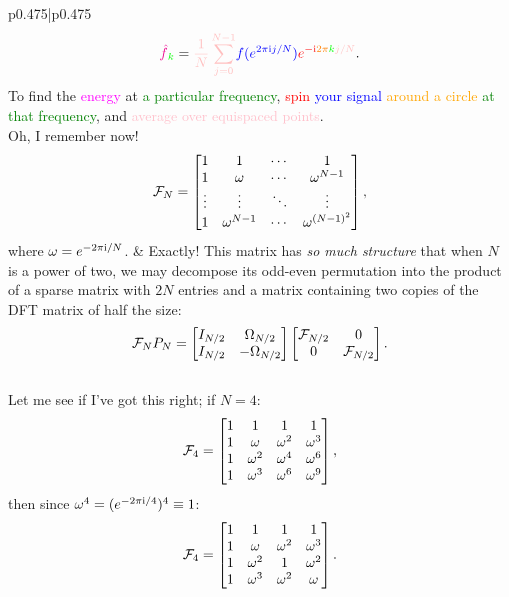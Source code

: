 \documentclass[11pt,letterpaper]{article}
\begin{document}
\begin{longtable}{p{}|p{}}
\[
\textcolor{magenta}{\hat{f}}_{\textcolor{green}{k}} = \textcolor{pink}{\dfrac{1}{N}\sum_{j=0}^{N-1}} \textcolor{blue}{f(e^{2\pi\i j/N})}\textcolor{red}{e}^{\textcolor{red}{-\i}\textcolor{orange}{2\pi} \textcolor{green}{k}\textcolor{pink}{j/N}}.
\]
To find the \textcolor{magenta}{energy} at \textcolor{green}{a particular frequency}, \textcolor{red}{spin} \textcolor{blue}{your signal} \textcolor{orange}{around a circle} \textcolor{green}{at that frequency}, and \textcolor{pink}{average over equispaced points}.
\\
\hline
Oh, I remember now!
\[
\mathcal{F}_N = \begin{bmatrix}
1 & 1 & \cdots & 1\\
1 & \omega & \cdots & \omega^{N-1}\\
\vdots & \vdots & \ddots & \vdots\\
1 & \omega^{N-1} & \cdots & \omega^{(N-1)^2}
\end{bmatrix},
\]
where $\omega = e^{-2\pi{\rm i}/N}$. & Exactly! This matrix has {\em so much structure} that when $N$ is a power of two, we may decompose its odd-even permutation into the product of a sparse matrix with $2N$ entries and a matrix containing two copies of the DFT matrix of half the size:
\[
\mathcal{F}_NP_N = \begin{bmatrix}
I_{N/2} & \Omega_{N/2}\\
I_{N/2} & -\Omega_{N/2}\\
\end{bmatrix}
\begin{bmatrix}
\mathcal{F}_{N/2} & 0\\
0 & \mathcal{F}_{N/2}\\
\end{bmatrix}.
\]\\
\hline
Let me see if I've got this right; if $N=4$:
\[
\mathcal{F}_4 = \begin{bmatrix}
1 & 1 & 1 & 1\\
1 & \omega & \omega^2 & \omega^3\\
1 & \omega^2 & \omega^4 & \omega^6\\
1 & \omega^3 & \omega^6 & \omega^9
\end{bmatrix},
\]
then since $\omega^4 = (e^{-2\pi{\rm i}/4})^4\equiv1$:
\[
\mathcal{F}_4 = \begin{bmatrix}
1 & 1 & 1 & 1\\
1 & \omega & \omega^2 & \omega^3\\
1 & \omega^2 & 1 & \omega^2\\
1 & \omega^3 & \omega^2 & \omega
\end{bmatrix}.
\]
\end{longtable}
\end{document}

